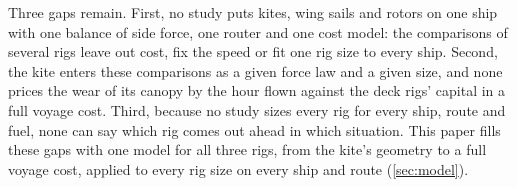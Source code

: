 Three gaps remain. First, no study puts kites, wing sails and rotors on one ship with one balance of side force, one router and one cost model: the comparisons of several rigs leave out cost, fix the speed or fit one rig size to every ship. Second, the kite enters these comparisons as a given force law and a given size, and none prices the wear of its canopy by the hour flown against the deck rigs' capital in a full voyage cost. Third, because no study sizes every rig for every ship, route and fuel, none can say which rig comes out ahead in which situation. This paper fills these gaps with one model for all three rigs, from the kite's geometry to a full voyage cost, applied to every rig size on every ship and route (\cref{sec:model}).
